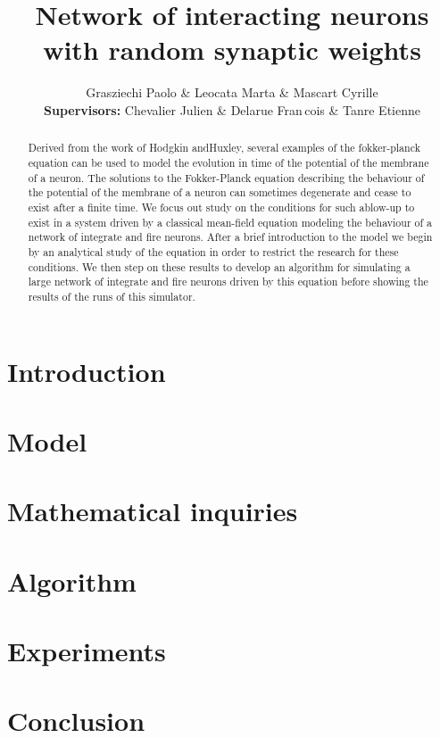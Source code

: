 \documentclass{report}
\title{Network of interacting neurons with random synaptic weights}
\author{Grasziechi Paolo \& Leocata Marta \& Mascart Cyrille\\
		\textbf{Supervisors:} Chevalier Julien \& Delarue Fran\,cois \& Tanre Etienne}
\date{}
\begin{document}
	\maketitle
	\begin{abstract}
		Derived from the work of Hodgkin andHuxley, several examples of the fokker-planck equation can be used to model the evolution in time of the potential of the membrane of a neuron. The solutions to the Fokker-Planck equation describing the behaviour of the potential of the membrane of a neuron can sometimes degenerate and cease to exist after a finite time. We focus out study on the conditions for such ablow-up to exist in a system driven by a classical mean-field equation modeling the behaviour of a network of integrate and fire neurons. After a brief introduction to the model we begin by an analytical study of the equation in order to restrict the research for these conditions. We then step on these results to develop an algorithm for simulating a large network of integrate and fire neurons driven by this equation before showing the results of the runs of this simulator.
	\end{abstract}
	\tableofcontents
	\listoffigures
	\listoftables

	\chapter*{Introduction}
	\chapter{Model}
	\chapter{Mathematical inquiries}
	\chapter{Algorithm}
	\chapter{Experiments}
	\chapter*{Conclusion}
\end{document}
